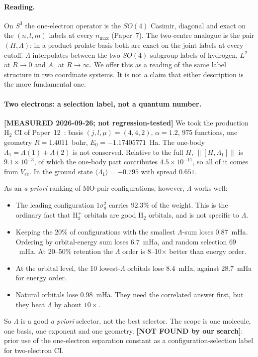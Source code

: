 \documentclass[aps,pra,twocolumn,superscriptaddress,longbibliography]{revtex4-2}
\begin{document}
\paragraph{Reading.}
On $S^3$ the one-electron operator is the $SO(4)$ Casimir, diagonal and
exact on the $(n,l,m)$ labels at every $n_{\max}$ (Paper~7). The
two-centre analogue is the pair $(H,\Lambda)$: in a product prolate
basis both are exact on the joint labels at every cutoff. $\Lambda$
interpolates between the two $SO(4)$ subgroup labels of hydrogen, $L^2$
at $R\to0$ and $A_z$ at $R\to\infty$. We offer this as a reading of the
same label structure in two coordinate systems. It is not a claim that
either description is the more fundamental one.

\paragraph{Two electrons: a selection label, not a quantum number.}
\textbf{[MEASURED 2026-09-26; not regression-tested]} We took the
production H$_2$ CI of Paper~12~\cite{loutey_paper12}: basis
$(j,l,\mu) = (4,4,2)$, $\alpha = 1.2$, 975 functions, one geometry
$R = 1.4011$~bohr, $E_0 = -1.17405771$~Ha. The one-body
$\Lambda_1 = \Lambda(1)+\Lambda(2)$ is not conserved. Relative to the
full $H$, $\|[H,\Lambda_1]\|$ is $9.1\times10^{-3}$, of which the
one-body part contributes $4.5\times10^{-11}$, so all of it comes from
$V_{ee}$. In the ground state $\langle\Lambda_1\rangle = -0.795$ with
spread $0.651$.

As an \emph{a priori} ranking of MO-pair configurations, however,
$\Lambda$ works well:
\begin{itemize}
  \item The leading configuration $1\sigma_g^2$ carries $92.3\%$ of the
    weight. This is the ordinary fact that H$_2^+$ orbitals are good
    H$_2$ orbitals, and is not specific to $\Lambda$.
  \item Keeping the 20\% of configurations with the smallest
    $\Lambda$-sum loses $0.87$~mHa. Ordering by orbital-energy sum loses
    $6.7$~mHa, and random selection $69$~mHa. At 20--50\% retention the
    $\Lambda$ order is 8--10$\times$ better than energy order.
  \item At the orbital level, the 10 lowest-$\Lambda$ orbitals lose
    $8.4$~mHa, against $28.7$~mHa for energy order.
  \item Natural orbitals lose $0.98$~mHa. They need the correlated
    answer first, but they beat $\Lambda$ by about $10\times$.
\end{itemize}
So $\Lambda$ is a good \emph{a priori} selector, not the best selector.
The scope is one molecule, one basis, one exponent and one geometry.
\textbf{[NOT FOUND by our search]}: prior use of the one-electron
separation constant as a configuration-selection label for two-electron
CI.
\end{document}
